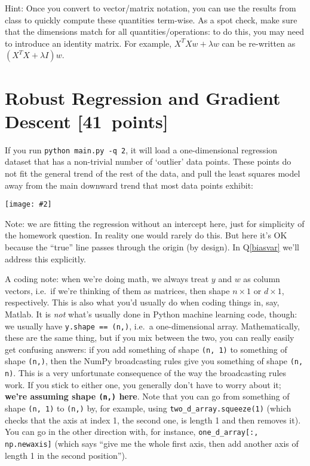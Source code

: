 \documentclass{article}
\newcommand\pts[1]{\textcolor{pointscolour}{[#1~points]}}
\newcommand{\centerfig}[2]{\begin{center}\texttt{[image: \#2]}\end{center}}
\begin{document}
Hint: Once you convert to vector/matrix notation, you can use the results from class to quickly compute these quantities term-wise.
As a spot check, make sure that the dimensions match for all quantities/operations: to do this, you may need to introduce an identity matrix. For example, $X^T X w + \lambda w$ can be re-written as $(X^T X + \lambda I)w$.


\clearpage
\section{Robust Regression and Gradient Descent \pts{41}}

If you run \verb|python main.py -q 2|, it will load a one-dimensional regression
dataset that has a non-trivial number of `outlier' data points.
These points do not fit the general trend of the rest of the data,
and pull the least squares model away from the main downward trend that most data points exhibit:
\centerfig{.7}{./figs/least_squares_outliers.pdf}

Note: we are fitting the regression without an intercept here, just for simplicity of the homework question.
In reality one would rarely do this. But here it's OK because the ``true'' line
passes through the origin (by design). In Q\ref{biasvar} we'll address this explicitly.

A coding note:
when we're doing math, we always treat $y$ and $w$ as column vectors,
i.e.\ if we're thinking of them as matrices, then shape $n \times 1$ or $d \times 1$, respectively.
This is also what you'd usually do when coding things in, say, Matlab.
It is \emph{not} what's usually done in Python machine learning code, though:
we usually have \verb|y.shape == (n,)|, i.e.\ a one-dimensional array.
Mathematically, these are the same thing, but if you mix between the two,
you can really easily get confusing answers:
if you add something of shape \texttt{(n, 1)} to something of shape \texttt{(n,)},
then the NumPy broadcasting rules give you something of shape \texttt{(n, n)}.
This is a very unfortunate consequence of the way the broadcasting rules work.
If you stick to either one, you generally don't have to worry about it;
\textbf{we're assuming shape \texttt{(n,)} here}.
Note that you can go from something of shape \texttt{(n, 1)} to \texttt{(n,)}
by, for example, using \texttt{two\_d\_array.squeeze(1)}
(which checks that the axis at index 1, the second one, is length 1 and then removes it).
You can go in the other direction with, for instance, \texttt{one\_d\_array[:, np.newaxis]}
(which says ``give me the whole first axis, then add another axis of length 1 in the second position'').
\end{document}
